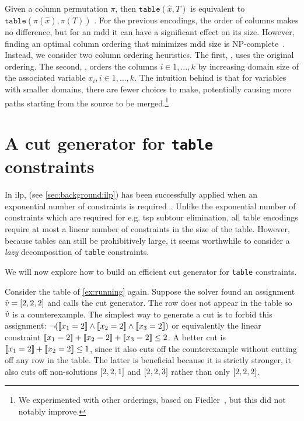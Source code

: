 \documentclass[a4paper,UKenglish,cleveref,autoref,thm-restate]{lipics-v2021}
\newcommand{\milp}{\gls{ilp}\xspace}
\begin{document}
Given a column permutation $\pi$, then $\texttt{table}(\hat{x},T)$ is equivalent to $\texttt{table}(\pi(\hat{x}),\pi(T))$ .
For the previous encodings, the order of columns makes no difference, but for an \gls{mdd} it can have a significant effect on its size.
However, finding an optimal column ordering that minimizes \gls{mdd} size is NP-complete~\cite{DBLP:journals/tc/BolligW96}. 
Instead, we consider two column ordering heuristics.
The first, \baseMddInput, uses the original ordering.
The second, \baseMddDomIncr, orders the columns $i \in 1, \dots, k$ by increasing domain size of the associated variable $x_i, i \in 1, \dots, k$.
The intuition behind \baseMddDomIncr is that for variables with smaller domains, there are fewer choices to make, potentially causing more paths starting from the source to be merged.\footnote{We experimented with other orderings, \eg based on Fiedler~\cite{Fiedler1975}, but this did not notably improve.}


\section{A cut generator for \texttt{table} constraints}
\label{sec:cuts}



In \milp,  (see \cref{sec:background:ilp}) has been successfully applied when an exponential number of constraints is required~\cite{DBLP:journals/ior/Hooker07}.
Unlike the exponential number of constraints which are required for e.g. \gls{tsp} subtour elimination, all table encodings require at most a linear number of constraints in the size of the table.
However, because tables can still be prohibitively large, it seems worthwhile to consider a \emph{lazy} decomposition of \texttt{table} constraints.

We will now explore how to build an efficient cut generator for \texttt{table} constraints. 

\begin{example}
\label{ex:initial}
   Consider the table of \cref{ex:running} again.
Suppose the solver found an assignment $\hat{v} = [2,2,2]$ and calls the cut generator.
The row does not appear in the table so $\hat{v}$ is a counterexample.
The simplest way to generate a cut is to forbid this assignment: 
$\neg ([\![x_{1} = 2]\!] \wedge [\![x_{2} = 2]\!] \wedge [\![x_{3} = 2]\!])$ or equivalently the linear constraint
$[\![x_{1} = 2]\!] + [\![x_{2} = 2]\!] + [\![x_{3} = 2]\!] \leq 2$.
A better cut is
$[\![x_{1} = 2]\!] + [\![x_{2} = 2]\!] \leq 1$, since it also cuts off the counterexample without cutting off any row in the table.
The latter is beneficial because it is strictly stronger, \eg it also cuts off non-solutions $[2,2,1]$ and $[2,2,3]$ rather than only $[2,2,2]$.
\end{example}
\end{document}

